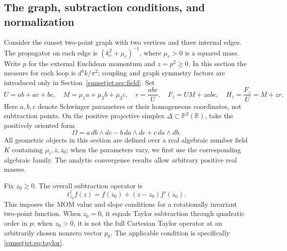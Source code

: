 \documentclass[11pt,a4paper,oneside]{article}
\theoremstyle{plain}
\theoremstyle{definition}
\theoremstyle{remark}
\newcommand{\Q}{\mathbb Q}
\newcommand{\im}{\operatorname{im}}
\newcommand{\dR}{\mathrm{dR}}
\numberwithin{equation}{section}
\begin{document}
\endgroup



\begingroup
\providecommand{\Q}{\mathbb Q}
\providecommand{\A}{\mathbb A}
\providecommand{\PP}{\mathbb P}
\providecommand{\per}{\operatorname{per}}
\providecommand{\im}{\operatorname{im}}
\providecommand{\dR}{\mathrm{dR}}
\providecommand{\SR}{S_{\mathrm R}}
\subsection{The graph, subtraction conditions, and normalization}
Consider the sunset two-point graph with two vertices and three internal edges. The propagator on each edge is
$(k_e^2+\mu_e)^{-1}$, where $\mu_e>0$ is a squared mass.
Write $p$ for the external Euclidean momentum and $z=p^2\geq0$.
In this section the measure for each loop is $d^4k/\pi^2$; coupling and graph symmetry factors are introduced only in Section~\ref{sunsetjet:sec:field}.
Set
\begin{equation}\label{sunsetjet:eq:poly}
 U=ab+ac+bc,\quad M=\mu_1a+\mu_2b+\mu_3c,\quad
 r=\frac{abc}{U},\quad F_z=UM+zabc,\quad H_z=\frac{F_z}{U}=M+zr.
\end{equation}
Here $a,b,c$ denote Schwinger parameters or their homogeneous coordinates, not subtraction points.
On the positive projective simplex $\Delta\subset\PP^2(\mathbb R)$, take the positively oriented form
\[
 \Omega=a\,db\wedge dc-b\,da\wedge dc+c\,da\wedge db.
\]
All geometric objects in this section are defined over a real algebraic number field $K$ containing $\mu_i,z,z_0$;
when the parameters vary, we first use the corresponding algebraic family. The analytic convergence results allow arbitrary positive real masses.

Fix $z_0\geq0$. The overall subtraction operator is
\begin{equation}\label{sunsetjet:eq:taylor}
 t_{z_0}^1 f(z)=f(z_0)+(z-z_0)f'(z_0).
\end{equation}
This imposes the MOM value and slope conditions for a rotationally invariant two-point function.
When $z_0=0$, it equals Taylor subtraction through quadratic order in $p$;
when $z_0>0$, it is not the full Cartesian Taylor operator at an arbitrarily chosen nonzero vector $p_0$.
The applicable condition is specifically \eqref{sunsetjet:eq:taylor}.
\end{document}
